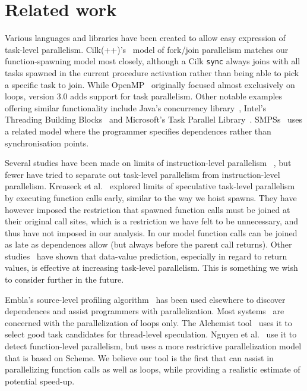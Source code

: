 \section{Related work}

Various languages and libraries have been created to allow easy
expression of task-level parallelism.  Cilk(++)'s~\cite{blumofe96cilk,leiserson09cilk}
model of fork/join parallelism matches our function-spawning model
most closely, although a Cilk {\tt sync} always joins with all tasks 
spawned in the current procedure activation rather than being able to 
pick a specific task to join. While OpenMP~\cite{dagum98openmp} 
originally focused almost exclusively on loops, version 3.0 adds 
support for task parallelism.  Other notable examples
offering similar functionality 
include Java's concurrency library~\cite{lea00java}, Intel's
Threading Building Blocks~\cite{reinders07intel} and Microsoft's
Task Parallel Library~\cite{leijen07parallel}.
SMPSs~\cite{perez08dependency} uses a related model where the programmer
specifies dependences rather than synchronisation points.

Several studies have been made on limits of instruction-level parallelism~
\cite{wall91limits,postiff99limits},
but fewer have tried to separate out task-level
parallelism from instruction-level parallelism.  Kreaseck et al.\
 explored limits of speculative task-level
parallelism by executing function calls early, similar to the
way we hoist spawns.  They have however imposed the restriction that
spawned function calls must be joined at their original call sites,
which is a restriction we have felt to be unnecessary, and thus have
not imposed in our analysis.  In our model function calls can be
joined as late as dependences allow (but always before the parent
call returns).  Other studies~\cite{warg01limits,oplinger99insearch}
have shown that data-value prediction, especially in regard to return
values, is effective at increasing task-level parallelism.  This is
something we wish to consider further in the future.

Embla's source-level profiling algorithm~\cite{embla:08} has been used 
elsewhere to discover dependences and assist programmers with parallelization.
Most systems~\cite{wu08compiler,tournavitis09towards,larus93loop}
are concerned with the parallelization of loops only.
The Alchemist tool~\cite{zhang09alchemist} uses it
to select good task candidates for thread-level speculation.
Nguyen et al.~\cite{nguyen02parallelizing} use it to detect function-level parallelism,
but uses a more restrictive parallelization model that is based on Scheme.
We believe our tool is the first that can assist in parallelizing function calls as well as loops,
while providing a realistic estimate of potential speed-up.

